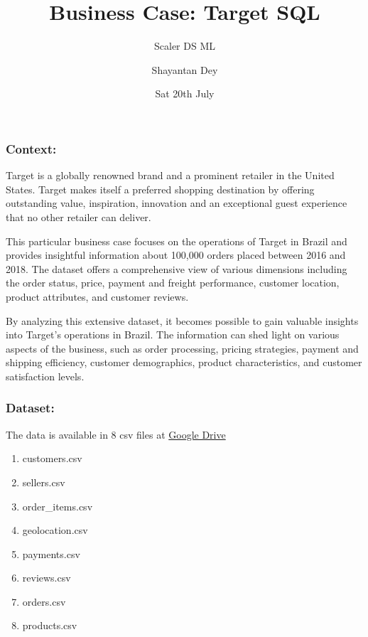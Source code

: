 \documentclass[
]{article}
\title{Business Case: Target SQL}
\subtitle{Scaler DS ML}
\author{Shayantan Dey}
\date{Sat 20th July}
\providecommand{\tightlist}{%
  \setlength{\itemsep}{0pt}\setlength{\parskip}{0pt}}
\begin{document}
\maketitle

\subsubsection{Context:}\label{context}

Target is a globally renowned brand and a prominent retailer in the
United States. Target makes itself a preferred shopping destination by
offering outstanding value, inspiration, innovation and an exceptional
guest experience that no other retailer can deliver.

This particular business case focuses on the operations of Target in
Brazil and provides insightful information about 100,000 orders placed
between 2016 and 2018. The dataset offers a comprehensive view of
various dimensions including the order status, price, payment and
freight performance, customer location, product attributes, and customer
reviews.

By analyzing this extensive dataset, it becomes possible to gain
valuable insights into Target's operations in Brazil. The information
can shed light on various aspects of the business, such as order
processing, pricing strategies, payment and shipping efficiency,
customer demographics, product characteristics, and customer
satisfaction levels.

\subsubsection{Dataset:}\label{dataset}

The data is available in 8 csv files at
\href{https://drive.google.com/drive/folders/1TGEc66YKbD443nslRi1bWgVd238gJCnb}{Google
Drive}

\begin{enumerate}
\def\labelenumi{\arabic{enumi}.}
\tightlist
\item
  customers.csv\\
\item
  sellers.csv\\
\item
  order\_items.csv\\
\item
  geolocation.csv\\
\item
  payments.csv\\
\item
  reviews.csv\\
\item
  orders.csv\\
\item
  products.csv
\end{enumerate}
\end{document}
